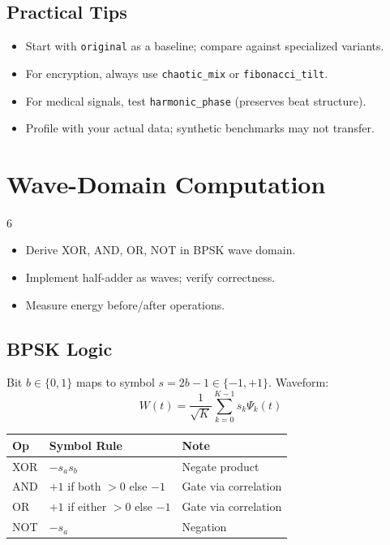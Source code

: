 \documentclass[11pt, a4paper, openany]{book}
\theoremstyle{definition}
\begin{document}
\section{Practical Tips}
\begin{itemize}
    \item Start with \texttt{original} as a baseline; compare against specialized variants.
    \item For encryption, always use \texttt{chaotic\_mix} or \texttt{fibonacci\_tilt}.
    \item For medical signals, test \texttt{harmonic\_phase} (preserves beat structure).
    \item Profile with your actual data; synthetic benchmarks may not transfer.
\end{itemize}

\chapter{Wave-Domain Computation}

\begin{todobox}{6}
\begin{itemize}
    \item[$\square$] Derive XOR, AND, OR, NOT in BPSK wave domain.
    \item[$\square$] Implement half-adder as waves; verify correctness.
    \item[$\square$] Measure energy before/after operations.
\end{itemize}
\end{todobox}

\section{BPSK Logic}
Bit $b \in \{0,1\}$ maps to symbol $s=2b-1 \in \{-1,+1\}$. Waveform:
\begin{equation}
    W(t) = \frac{1}{\sqrt{K}} \sum_{k=0}^{K-1} s_k \Psi_k(t)
\end{equation}

\begin{table}[h]
\centering
\begin{tabular}{@{}lll@{}}\toprule
Op & Symbol Rule & Note \\ \midrule
XOR & $-s_a s_b$ & Negate product \\
AND & $+1$ if both $>0$ else $-1$ & Gate via correlation \\
OR  & $+1$ if either $>0$ else $-1$ & Gate via correlation \\
NOT & $-s_a$ & Negation \\ \bottomrule
\end{tabular}
\end{table}
\end{document}
